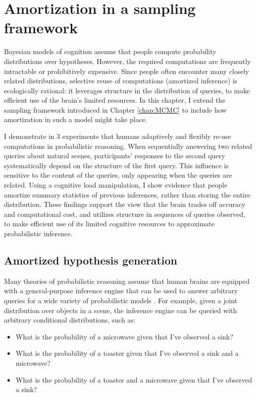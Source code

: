 
\chapter{Amortization in a sampling framework}
\label{chap:MCMC_amort}

Bayesian models of cognition assume that people compute probability distributions over hypotheses. However, the required computations are frequently intractable or prohibitively expensive. Since people often encounter many closely related distributions, selective reuse of computations (amortized inference) is ecologically rational: it leverages structure in the distribution of queries, to make efficient use of the brain’s limited resources. In this chapter, I extend the sampling framework introduced in Chapter \ref{chap:MCMC} to include how amortization in such a model might take place. 


I demonstrate in 3 experiments that humans adaptively and flexibly re-use computations in probabilistic reasoning. When sequentially answering two related queries about natural scenes, participants’ responses to the second query systematically depend on the structure of the first query. This influence is sensitive to the content of the queries, only appearing when the queries are related. Using a cognitive load manipulation, I show evidence that people amortize summary statistics of previous inferences, rather than storing the entire distribution. These findings support the view that the brain trades off accuracy and computational cost, and utilizes structure in sequences of queries observed, to make efficient use of its limited cognitive resources to approximate probabilistic inference.


\section{Amortized hypothesis generation}

Many theories of probabilistic reasoning assume that human brains are equipped with a general-purpose inference engine that can be used to answer arbitrary queries for a wide variety of probabilistic models \citep{griffiths2012bridging, oaksford2007bayesian}. For example, given a joint distribution over objects in a scene, the inference engine can be queried with arbitrary conditional distributions, such as:
\begin{itemize}
\item What is the probability of a microwave given that I've observed a sink?
\item What is the probability of a toaster given that I've observed a sink and a microwave?
\item What is the probability of a toaster and a microwave given that I've observed a sink?
\end{itemize}

